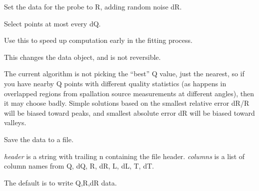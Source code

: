 \documentclass[letterpaper,10pt,english]{sphinxmanual}
\begin{document}
\begin{fulllineitems}
\begin{fulllineitems}
\end{fulllineitems}


\begin{fulllineitems}
\label{api/probe:refl1d.probe.Probe.simulate_data}
Set the data for the probe to R, adding random noise dR.

\end{fulllineitems}


\begin{fulllineitems}
\label{api/probe:refl1d.probe.Probe.subsample}
Select points at most every dQ.

Use this to speed up computation early in the fitting process.

This changes the data object, and is not reversible.

The current algorithm is not picking the ``best'' Q value, just the
nearest, so if you have nearby Q points with different quality
statistics (as happens in overlapped regions from spallation
source measurements at different angles), then it may choose
badly.  Simple solutions based on the smallest relative error dR/R
will be biased toward peaks, and smallest absolute error dR will
be biased toward valleys.

\end{fulllineitems}


\begin{fulllineitems}
\label{api/probe:refl1d.probe.Probe.write_data}
Save the data to a file.

\emph{header} is a string with trailing n containing the file header.
\emph{columns} is a list of column names from Q, dQ, R, dR, L, dL, T, dT.

The default is to write Q,R,dR data.

\end{fulllineitems}


\end{fulllineitems}

\end{document}
